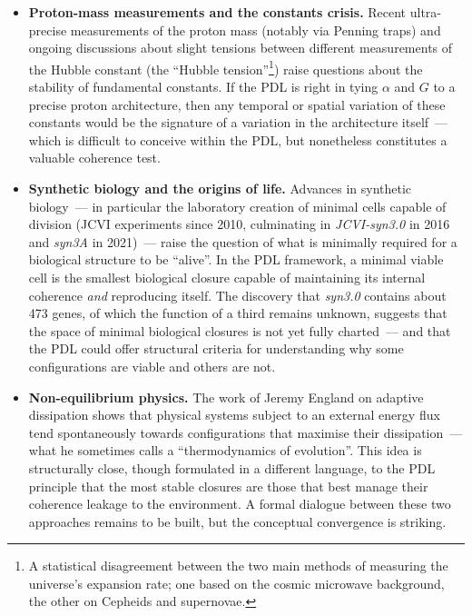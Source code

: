 \documentclass[12pt, a4paper, openright]{book}
\begin{document}
\begin{itemize}
\item \textbf{Proton-mass measurements and the constants crisis.} Recent ultra-precise measurements of the proton mass (notably via Penning traps) and ongoing discussions about slight tensions between different measurements of the Hubble constant (the ``Hubble tension''\footnote{A statistical disagreement between the two main methods of measuring the universe's expansion rate; one based on the cosmic microwave background, the other on Cepheids and supernovae.}) raise questions about the stability of fundamental constants. If the PDL is right in tying $\alpha$ and $G$ to a precise proton architecture, then any temporal or spatial variation of these constants would be the signature of a variation in the architecture itself~--- which is difficult to conceive within the PDL, but nonetheless constitutes a valuable coherence test.

\item \textbf{Synthetic biology and the origins of life.} Advances in synthetic biology~--- in particular the laboratory creation of minimal cells capable of division (JCVI experiments since 2010, culminating in \textit{JCVI-syn3.0} in 2016 and \textit{syn3A} in 2021)~--- raise the question of what is minimally required for a biological structure to be ``alive''. In the PDL framework, a minimal viable cell is the smallest biological closure capable of maintaining its internal coherence \emph{and} reproducing itself. The discovery that \textit{syn3.0} contains about 473 genes, of which the function of a third remains unknown, suggests that the space of minimal biological closures is not yet fully charted~--- and that the PDL could offer structural criteria for understanding why some configurations are viable and others are not.

\item \textbf{Non-equilibrium physics.} The work of Jeremy England on adaptive dissipation shows that physical systems subject to an external energy flux tend spontaneously towards configurations that maximise their dissipation~--- what he sometimes calls a ``thermodynamics of evolution''. This idea is structurally close, though formulated in a different language, to the PDL principle that the most stable closures are those that best manage their coherence leakage to the environment. A formal dialogue between these two approaches remains to be built, but the conceptual convergence is striking.

\end{itemize}
\end{document}
